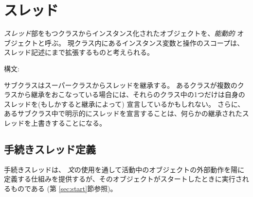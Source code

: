 \documentclass[\pformat,12pt]{jarticle}
\begin{document}
\section{スレッド}\label{ch:thread}

{\em スレッド}部をもつクラスからインスタンス化されたオブジェクトを、{\em 能動的} オブジェクトと呼ぶ。
現クラス内にあるインスタンス変数と操作のスコープは、スレッド記述にまで拡張するものと考えられる。

\begin{description}
\item[構文:]   
\end{description}

サブクラスはスーパークラスからスレッドを継承する。
あるクラスが複数のクラスから継承をおこなっている場合には、それらのクラス中の1つだけは自身のスレッドを(もしかすると継承によって) 宣言しているかもしれない。 
さらに、あるサブクラス中で明示的にスレッドを宣言することは、何らかの継承されたスレッドを上書きすることになる。


\subsection{手続きスレッド定義}\label{se:proc-thread}

手続きスレッドは、 {\em 文}の使用を通して活動中のオブジェクトの外部動作を陽に定義する仕組みを提供するが、そのオブジェクトがスタートしたときに実行されるものである (第 \ref{sec:start}節参照)。  
\end{document}
